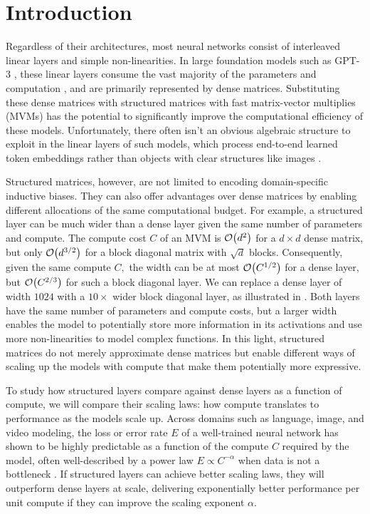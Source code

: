 \documentclass{article}
\theoremstyle{plain}
\theoremstyle{definition}
\theoremstyle{remark}
\begin{document}
\section{Introduction} \label{sec:intro}
Regardless of their architectures, most neural networks consist of interleaved linear layers and simple non-linearities. In large foundation models such as GPT-3 \citep{brown2020language}, these linear layers consume the vast majority of the parameters and computation \citep{kaplan2020scaling}, and are primarily represented by dense matrices.
Substituting these dense matrices with structured matrices with fast matrix-vector multiplies (MVMs) has the potential to significantly improve the computational efficiency of these models. Unfortunately, there often isn't an obvious algebraic structure to exploit in the linear layers of such models, which process end-to-end learned token embeddings rather than objects with clear structures like images \citep{vaswani2017attention}.
%

%

Structured matrices, however, are not limited to encoding domain-specific inductive biases. They can also offer advantages over dense matrices by enabling different allocations of the same computational budget. For example, a structured layer can be much wider than a dense layer given the same number of parameters and compute. The compute cost $C$ of an MVM is $\order{d^2}$ for a $d \times d$ dense matrix, but only $\order{d^{3/2}}$ for a block diagonal matrix with $\sqrt{d}$ blocks. Consequently, given the same compute $C,$ the width can be at most $\order{C^{1/2}}$ for a dense layer, but $\order{C^{2/3}}$ for such a block diagonal layer. We can replace a dense layer of width $1024$ with a $10\times$ wider block diagonal layer, as illustrated in .
Both layers have the same number of parameters and compute costs, but a larger width enables the model to potentially store more information in its activations and use more non-linearities to model complex functions. In this light, structured matrices do not merely approximate dense matrices but enable different ways of scaling up the models with compute that make them potentially more expressive.

%
To study how structured layers compare against dense layers as a function of compute, we will compare their scaling laws: how compute translates to performance as the models scale up. Across domains such as language, image, and video modeling, the loss or error rate $E$ of a well-trained neural network has shown to be highly predictable as a function of the compute $C$ required by the model, often well-described by a power law $E \propto C^{-\alpha}$ when data is not a bottleneck \citep{kaplan2020scaling, sharma2022scaling, hoffmann2022training}. If structured layers can achieve better scaling laws, they will outperform dense layers at scale, delivering exponentially better performance per unit compute if they can improve the scaling exponent $\alpha$.
\end{document}
